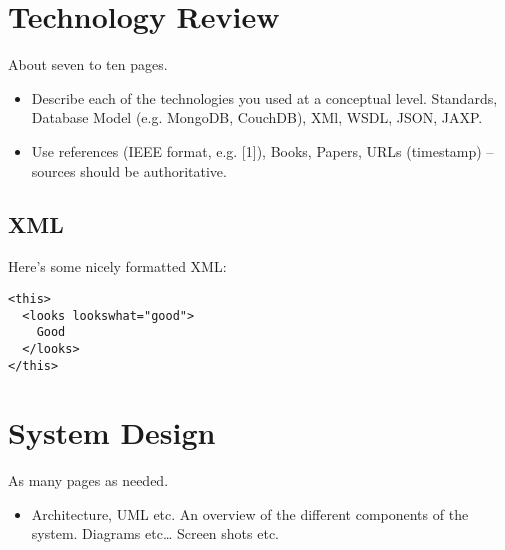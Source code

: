 \chapter{Technology Review}
About seven to ten pages.
\begin{itemize}

\section{J2EE}

\section{Heroku}

\section{MongoDB}

\section{SQL}

\section{Bootstrap}

\item Describe each of the technologies you used at a conceptual level. Standards, Database Model (e.g. MongoDB, CouchDB), XMl, WSDL, JSON, JAXP.
\item Use references (IEEE format, e.g. [1]), Books, Papers, URLs (timestamp) – sources should be authoritative. 
\end{itemize}

\section{XML}
Here's some nicely formatted XML:
\begin{verbatim}
<this>
  <looks lookswhat="good">
    Good
  </looks>
</this>
\end{verbatim}

\chapter{System Design}
As many pages as needed.
\begin{itemize}
\item Architecture, UML etc. An overview of the different components of the system. Diagrams etc… Screen shots etc.
\end{itemize}


